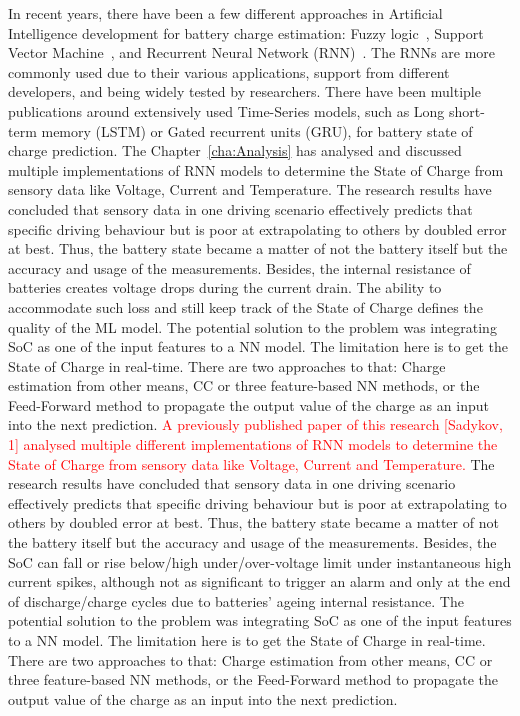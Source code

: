 %
In recent years, there have been a few different approaches in Artificial Intelligence development for battery charge estimation: Fuzzy logic~\cite{malkhandi_fuzzy_2006}, Support Vector Machine~\cite{hansen_support_2005, anton_battery_2013}, and Recurrent Neural Network (RNN)~\cite{song_lithium-ion_2018,Chemali2017,mamo_long_2020,jiao_gru-rnn_2020,xiao_accurate_2019,javid_adaptive_2020,zhang_deep_2020}.
The RNNs are more commonly used due to their various applications, support from different developers, and being widely tested by researchers.
There have been multiple publications around extensively used Time-Series models, such as Long short-term memory (LSTM) or Gated recurrent units (GRU), for battery state of charge prediction.
{
    The Chapter~\ref{cha:Analysis} has analysed and discussed multiple implementations of RNN models to determine the State of Charge from sensory data like Voltage, Current and Temperature.
    The research results have concluded that sensory data in one driving scenario effectively predicts that specific driving behaviour but is poor at extrapolating to others by doubled error at best.
    Thus, the battery state became a matter of not the battery itself but the accuracy and usage of the measurements.
    Besides, the internal resistance of batteries creates voltage drops during the current drain.
    The ability to accommodate such loss and still keep track of the State of Charge defines the quality of the ML model.
    The potential solution to the problem was integrating SoC as one of the input features to a NN model.
    The limitation here is to get the State of Charge in real-time.
    There are two approaches to that: Charge estimation from other means, CC or three feature-based NN methods, or the Feed-Forward method to propagate the output value of the charge as an input into the next prediction.
} {
    \textcolor{red}{A previously published paper of this research [Sadykov, 1] analysed multiple different implementations of RNN models to determine the State of Charge from sensory data like Voltage, Current and Temperature.}
    The research results have concluded that sensory data in one driving scenario effectively predicts that specific driving behaviour but is poor at extrapolating to others by doubled error at best.
    Thus, the battery state became a matter of not the battery itself but the accuracy and usage of the measurements.
    Besides, the SoC can fall or rise below/high under/over-voltage limit under instantaneous high current spikes, although not as significant to trigger an alarm and only at the end of discharge/charge cycles due to batteries' ageing internal resistance.
    The potential solution to the problem was integrating SoC as one of the input features to a NN model.
    The limitation here is to get the State of Charge in real-time.
    There are two approaches to that: Charge estimation from other means, CC or three feature-based NN methods, or the Feed-Forward method to propagate the output value of the charge as an input into the next prediction.
}


